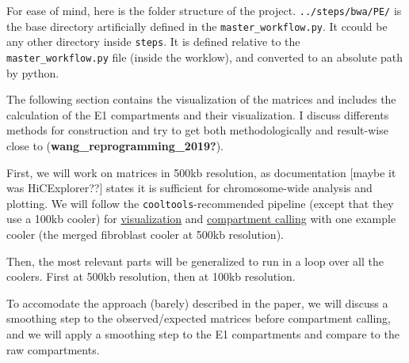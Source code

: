 \documentclass[
  a4paper,
  DIV=11,
  numbers=noendperiod]{scrarticle}
\begin{document}
\label{md-folder-structure}
For ease of mind, here is the folder structure of the project.
\texttt{../steps/bwa/PE/} is the base directory artificially defined in
the \texttt{master\_workflow.py}. It ccould be any other directory
inside \texttt{steps}. It is defined relative to the
\texttt{master\_workflow.py} file (inside the worklow), and converted to
an absolute path by python.

\begin{figure}


\caption{\label{fig-folder-structure}}

\end{figure}%

\label{md-plotting-main}
The following section contains the visualization of the matrices and
includes the calculation of the E1 compartments and their visualization.
I discuss differents methods for construction and try to get both
methodologically and result-wise close to
(\textbf{wang\_reprogramming\_2019?}).

First, we will work on matrices in 500kb resolution, as documentation
{[}maybe it was HiCExplorer??{]} states it is sufficient for
chromosome-wide analysis and plotting. We will follow the
\texttt{cooltools}-recommended pipeline (except that they use a 100kb
cooler) for
\href{https://cooltools.readthedocs.io/en/latest/notebooks/viz.html}{visualization}
and
\href{https://cooltools.readthedocs.io/en/latest/notebooks/compartments_and_saddles.html}{compartment
calling} with one example cooler (the merged fibroblast cooler at 500kb
resolution).

Then, the most relevant parts will be generalized to run in a loop over
all the coolers. First at 500kb resolution, then at 100kb resolution.

To accomodate the approach (barely) described in the paper, we will
discuss a smoothing step to the observed/expected matrices before
compartment calling, and we will apply a smoothing step to the E1
compartments and compare to the raw compartments.
\end{document}
